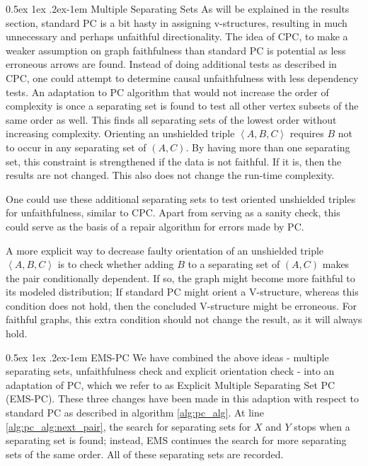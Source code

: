 \documentclass[a4paper, 10pt, english, onecolumn]{article}
\makeatletter
\renewcommand{\paragraph}{%
  \@startsection{paragraph}{4}%
  {\z@}{0.5ex \@plus 1ex \@minus .2ex}{-1em}%
  {\normalfont\normalsize\bfseries}%
}
\makeatother
\begin{document}
\paragraph{Multiple Separating Sets}
As will be explained in the results section, standard PC is a bit hasty in assigning v-structures, resulting in much unnecessary and perhaps unfaithful directionality.
The idea of CPC, to make a weaker assumption on graph faithfulness than standard PC is potential as less erroneous arrows are found.
Instead of doing additional tests as described in CPC, one could attempt to determine causal unfaithfulness with less dependency tests.
An adaptation to PC algorithm that would not increase the order of complexity is once a separating set is found to test all other vertex subsets of the same order as well.
This finds all separating sets of the lowest order without increasing complexity.
Orienting an unshielded triple $\left<A,B,C\right>$ requires $B$ not to occur in any separating set of $(A,C)$.
By having more than one separating set, this constraint is strengthened if the data is not faithful.
If it is, then the results are not changed.
This also does not change the run-time complexity.

One could use these additional separating sets to test oriented unshielded triples for unfaithfulness, similar to CPC.
Apart from serving as a sanity check, this could serve as the basis of a repair algorithm for errors made by PC.

A more explicit way to decrease faulty orientation of an unshielded triple $\left<A,B,C\right>$ is to check whether adding $B$ to a separating set of $(A,C)$ makes the pair conditionally dependent.
If so, the graph might become more faithful to its modeled distribution; If standard PC might orient a V-structure, whereas this condition does not hold, then the concluded V-structure might be erroneous.
For faithful graphs, this extra condition should not change the result, as it will always hold.

\paragraph{EMS-PC}
We have combined the above ideas - multiple separating sets, unfaithfulness check and explicit orientation check - into an adaptation of PC, which we refer to as Explicit Multiple Separating Set PC (EMS-PC).
These three changes have been made in this adaption with respect to standard PC as described in algorithm \ref{alg:pc_alg}.
At line \ref{alg:pc_alg:next_pair}, the search for separating sets for $X$ and $Y$ stops when a separating set is found; instead, EMS continues the search for more separating sets of the same order.
All of these separating sets are recorded.
\end{document}
